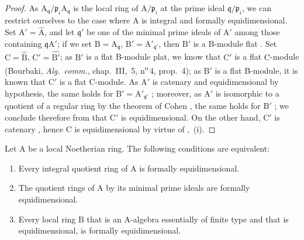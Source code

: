 \begin{proof}
As $\mathrm{A}_\mathfrak{q}/\mathfrak{p}_i\mathrm{A}_\mathfrak{q}$ is the local ring of $\mathrm{A}/\mathfrak{p}_i$ at the prime ideal $\mathfrak{q}/\mathfrak{p}_i$, we can restrict ourselves to the case where $\mathrm{A}$ is integral and formally equidimensional.
Set $\mathrm{A}'=\widehat{\mathrm{A}}$, and let $\mathfrak{q}'$ be one of the minimal prime ideals of $\mathrm{A}'$ among those containing $\mathfrak{q}\mathrm{A}'$; if we set $\mathrm{B}=\mathrm{A}_\mathfrak{q}$, $\mathrm{B}'=\mathrm{A}'_{\mathfrak{q}'}$, then $\mathrm{B}'$ is a B-module flat .
Set $\mathrm{C}=\widehat{\mathrm{B}}$, $\mathrm{C}'=\widehat{\mathrm{B}'}$; as $\mathrm{B}'$ is a flat B-module plat, we know that $\mathrm{C}'$ is a flat $\mathrm{C}$-module (Bourbaki, \emph{Alg.\ comm.}, chap.~III, \textsection\,5, n\textsuperscript{o}\,4, prop.~4); as $\mathrm{B}'$ is a flat B-module, it is known that $\mathrm{C}'$ is a flat $\mathrm{C}$-module.
As $\mathrm{A}'$ is catenary  and equidimensional by hypothesis, the same holds for $\mathrm{B}'=\mathrm{A}'_{\mathfrak{q}'}$ ; moreover, as $\mathrm{A}'$ is isomorphic to a quotient of a regular ring by the theorem of Cohen , the same holds for $\mathrm{B}'$ ; we conclude therefore from  that $\mathrm{C}'$ is equidimensional.
On the other hand, $\mathrm{C}'$ is catenary , hence $\mathrm{C}$ is equidimensional by virtue of ,~(i).
\end{proof}

\begin{theorem}[7.1.8]
\label{IV.7.1.8}
Let $\mathrm{A}$ be a local Noetherian ring.
The following conditions are equivalent:
\begin{enumerate}[label=\emph{\alph*)}]
  \item Every integral quotient ring of $\mathrm{A}$ is formally equidimensional.
  \item The quotient rings of $\mathrm{A}$ by its minimal prime ideals are formally equidimensional.
  \item Every local ring $\mathrm{B}$ that is an A-algebra essentially of finite type  and that is equidimensional, is formally equidimensional.
\end{enumerate}
\end{theorem}

